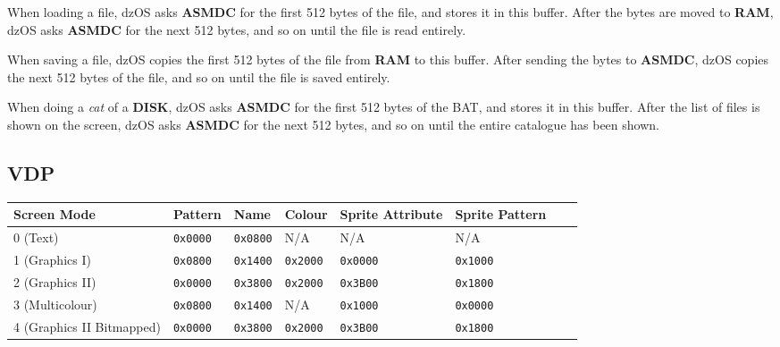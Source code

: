         When loading a file, dzOS asks \textbf{ASMDC} for the first 512 bytes of the
        file, and stores it in this buffer. After the bytes are moved to
        \textbf{RAM}, dzOS asks \textbf{ASMDC} for the next 512 bytes, and so on
        until the file is read entirely.

        When saving a file, dzOS copies the first 512 bytes of the file from
        \textbf{RAM} to this buffer. After sending the bytes to \textbf{ASMDC}, dzOS
        copies the next 512 bytes of the file, and so on until the file is saved
        entirely.

        When doing a \textit{cat} of a \textbf{DISK}, dzOS asks \textbf{ASMDC} for
        the first 512 bytes of the BAT, and stores it in this buffer. After the list
        of files is shown on the screen, dzOS asks \textbf{ASMDC} for the next 512
        bytes, and so on until the entire catalogue has been shown.

    \subsection{VDP}
    \label{subsec:vdp_memmap}

    \begin{tabular}{llllllll}
        \rowcolor[HTML]{C0C0C0} 
        Screen Mode & Pattern & Name & Colour & Sprite Attribute & Sprite Pattern \\
        \hline
        \cellcolor[HTML]{C0C0C0}0 (Text)                  & \texttt{0x0000} & \texttt{0x0800} & N/A             & N/A             & N/A \\
        \hline
        \cellcolor[HTML]{C0C0C0}1 (Graphics I)            & \texttt{0x0800} & \texttt{0x1400} & \texttt{0x2000} & \texttt{0x0000} & \texttt{0x1000} \\
        \hline
        \cellcolor[HTML]{C0C0C0}2 (Graphics II)           & \texttt{0x0000} & \texttt{0x3800} & \texttt{0x2000} & \texttt{0x3B00} & \texttt{0x1800} \\
        \hline
        \cellcolor[HTML]{C0C0C0}3 (Multicolour)           & \texttt{0x0800} & \texttt{0x1400} & N/A             & \texttt{0x1000} & \texttt{0x0000} \\
        \hline
        \cellcolor[HTML]{C0C0C0}4 (Graphics II Bitmapped) & \texttt{0x0000} & \texttt{0x3800} & \texttt{0x2000} & \texttt{0x3B00} & \texttt{0x1800} \\
    \end{tabular}
